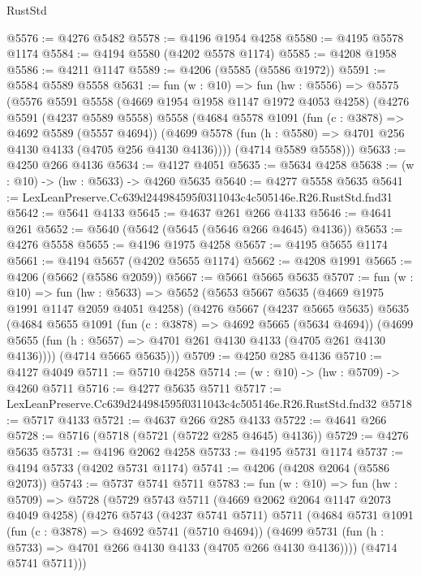 \begin{lexlean}{RustStd}
\begin{coremodule}
@5576 := @4276 @5482
@5578 := @4196 @1954 @4258
@5580 := @4195 @5578 @1174
@5584 := @4194 @5580 (@4202 @5578 @1174)
@5585 := @4208 @1958
@5586 := @4211 @1147
@5589 := @4206 (@5585 (@5586 @1972))
@5591 := @5584 @5589 @5558
@5631 := fun (w : @10) =>
  fun (hw : @5556) =>
  @5575
    (@5576
      @5591
      @5558
      (@4669 @1954 @1958 @1147 @1972 @4053 @4258)
      (@4276
        @5591
        (@4237 @5589 @5558)
        @5558
        (@4684
          @5578
          @1091
          (fun (c : @3878) => @4692 @5589 (@5557 @4694))
          (@4699 @5578 (fun (h : @5580) => @4701 @256 @4130 @4133 (@4705 @256 @4130 @4136))))
        (@4714 @5589 @5558)))
@5633 := @4250 @266 @4136
@5634 := @4127 @4051
@5635 := @5634 @4258
@5638 := (w : @10) -> (hw : @5633) -> @4260 @5635
@5640 := @4277 @5558 @5635
@5641 := LexLeanPreserve.Cc639d244984595f0311043c4c505146e.R26.RustStd.fnd31
@5642 := @5641 @4133
@5645 := @4637 @261 @266 @4133
@5646 := @4641 @261
@5652 := @5640 (@5642 (@5645 (@5646 @266 @4645) @4136))
@5653 := @4276 @5558
@5655 := @4196 @1975 @4258
@5657 := @4195 @5655 @1174
@5661 := @4194 @5657 (@4202 @5655 @1174)
@5662 := @4208 @1991
@5665 := @4206 (@5662 (@5586 @2059))
@5667 := @5661 @5665 @5635
@5707 := fun (w : @10) =>
  fun (hw : @5633) =>
  @5652
    (@5653
      @5667
      @5635
      (@4669 @1975 @1991 @1147 @2059 @4051 @4258)
      (@4276
        @5667
        (@4237 @5665 @5635)
        @5635
        (@4684
          @5655
          @1091
          (fun (c : @3878) => @4692 @5665 (@5634 @4694))
          (@4699 @5655 (fun (h : @5657) => @4701 @261 @4130 @4133 (@4705 @261 @4130 @4136))))
        (@4714 @5665 @5635)))
@5709 := @4250 @285 @4136
@5710 := @4127 @4049
@5711 := @5710 @4258
@5714 := (w : @10) -> (hw : @5709) -> @4260 @5711
@5716 := @4277 @5635 @5711
@5717 := LexLeanPreserve.Cc639d244984595f0311043c4c505146e.R26.RustStd.fnd32
@5718 := @5717 @4133
@5721 := @4637 @266 @285 @4133
@5722 := @4641 @266
@5728 := @5716 (@5718 (@5721 (@5722 @285 @4645) @4136))
@5729 := @4276 @5635
@5731 := @4196 @2062 @4258
@5733 := @4195 @5731 @1174
@5737 := @4194 @5733 (@4202 @5731 @1174)
@5741 := @4206 (@4208 @2064 (@5586 @2073))
@5743 := @5737 @5741 @5711
@5783 := fun (w : @10) =>
  fun (hw : @5709) =>
  @5728
    (@5729
      @5743
      @5711
      (@4669 @2062 @2064 @1147 @2073 @4049 @4258)
      (@4276
        @5743
        (@4237 @5741 @5711)
        @5711
        (@4684
          @5731
          @1091
          (fun (c : @3878) => @4692 @5741 (@5710 @4694))
          (@4699 @5731 (fun (h : @5733) => @4701 @266 @4130 @4133 (@4705 @266 @4130 @4136))))
        (@4714 @5741 @5711)))

\end{coremodule}
\end{lexlean}
